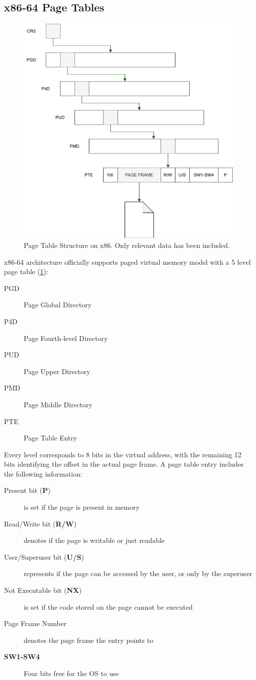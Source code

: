 \subsection{x86-64 Page Tables}
\label{subsec:x86pgtables}
\begin{figure}[]
  \centering
  \includegraphics[width = .35 \textwidth]{img/pagetable.pdf}
  \caption{Page Table Structure on x86. Only relevant data has been included.}
  \label{fig:pagetable}
\end{figure}
x86-64 architecture officially supports paged virtual memory model with a 5 
level page table (\cref{fig:pagetable}):
\begin{description}
    \item[PGD] Page Global Directory
    \item[P4D] Page Fourth-level Directory
    \item[PUD] Page Upper Directory
    \item[PMD] Page Middle Directory
    \item[PTE] Page Table Entry
\end{description}

Every level corresponds to 8 bits in the virtual address, with the remaining 12
bits identifying the offset in the actual page frame. A page table entry
includes the following information:
\begin{description}
    \item[Present bit (\textbf{P})] is set if the page is present in memory
    \item[Read/Write bit (\textbf{R/W})] denotes if the page is writable or just
         readable
    \item[User/Superuser bit (\textbf{U/S})] represents if the page can be 
    accessed by the user, or only by the superuser
    \item[Not Executable bit (\textbf{NX})] is set if the code stored on the 
    page cannot be executed
    \item[Page Frame Number] denotes the page frame the entry points to
    \item[\textbf{SW1-SW4}] Four bits free for the OS to use
\end{description}

